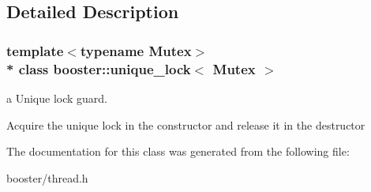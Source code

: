 \subsection{Detailed Description}
\subsubsection*{template$<$typename Mutex$>$\\*
class booster\+::unique\+\_\+lock$<$ Mutex $>$}

a Unique lock guard. 

Acquire the unique lock in the constructor and release it in the destructor 

The documentation for this class was generated from the following file\+:\begin{DoxyCompactItemize}
\item 
booster/thread.\+h\end{DoxyCompactItemize}
